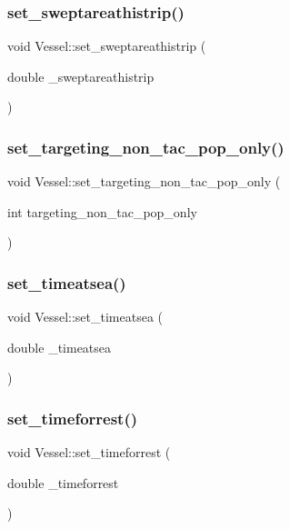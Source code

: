 \subsubsection{\texorpdfstring{set\_sweptareathistrip()}{set\_sweptareathistrip()}}
{\footnotesize\ttfamily void Vessel\+::set\+\_\+sweptareathistrip (\begin{DoxyParamCaption}\item[{double}]{\+\_\+sweptareathistrip }\end{DoxyParamCaption})}

\mbox{\label{class_vessel_a4365d7673cb95a798fa713f427af2aa4}} 
\subsubsection{\texorpdfstring{set\_targeting\_non\_tac\_pop\_only()}{set\_targeting\_non\_tac\_pop\_only()}}
{\footnotesize\ttfamily void Vessel\+::set\+\_\+targeting\+\_\+non\+\_\+tac\+\_\+pop\+\_\+only (\begin{DoxyParamCaption}\item[{int}]{targeting\+\_\+non\+\_\+tac\+\_\+pop\+\_\+only }\end{DoxyParamCaption})}

\mbox{\label{class_vessel_ae920b371efe17e0f297a29c5a447ab8e}} 
\subsubsection{\texorpdfstring{set\_timeatsea()}{set\_timeatsea()}}
{\footnotesize\ttfamily void Vessel\+::set\+\_\+timeatsea (\begin{DoxyParamCaption}\item[{double}]{\+\_\+timeatsea }\end{DoxyParamCaption})}

\mbox{\label{class_vessel_ab26a4a58cc3993572734b8dda2fbfa33}} 
\subsubsection{\texorpdfstring{set\_timeforrest()}{set\_timeforrest()}}
{\footnotesize\ttfamily void Vessel\+::set\+\_\+timeforrest (\begin{DoxyParamCaption}\item[{double}]{\+\_\+timeforrest }\end{DoxyParamCaption})}

